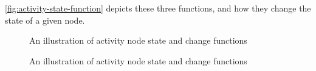 \autoref{fig:activity-state-function} depicts these three functions, and how they change the state of a given node.

\fi

\begin{figure}[!ht]
	\centering
	
	\caption{An illustration of activity node state and change functions}
	\label{fig:activity-state-function}
\end{figure}

\begin{figure}[!ht]
	\centering
	
	\caption{An illustration of activity node state and change functions}
	\label{fig:activity-state-function-ir}
\end{figure}